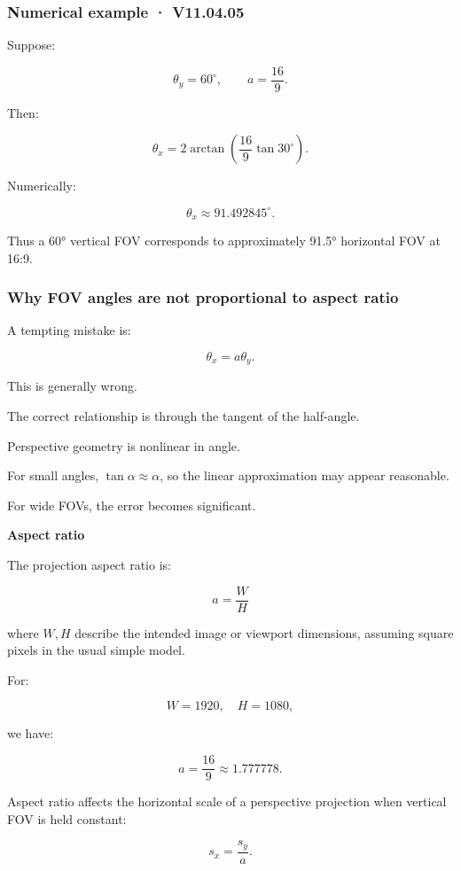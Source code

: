 \subsubsection{Numerical example · V11.04.05}\label{numerical-example-v11.04.05}

Suppose:

\[
 \theta_y=60^\circ, \qquad a=\frac{16}{9}.
\]

Then:

\[
 \theta_x= 2\arctan \left( \frac{16}{9}\tan30^\circ \right).
\]

Numerically:

\[
 \boxed{ \theta_x\approx91.492845^\circ }.
\]

Thus a 60° vertical FOV corresponds to approximately 91.5° horizontal FOV at 16:9.

\subsubsection{Why FOV angles are not proportional to aspect ratio}\label{why-fov-angles-are-not-proportional-to-aspect-ratio}

A tempting mistake is:

\[
 \theta_x=a\theta_y.
\]

This is generally wrong.

The correct relationship is through the tangent of the half-angle.

Perspective geometry is nonlinear in angle.

For small angles, \(\tan\alpha\approx\alpha\), so the linear approximation may appear reasonable.

For wide FOVs, the error becomes significant.

\textbf{Aspect ratio}

The projection aspect ratio is:

\[
 \boxed{ a=\frac WH }
\]

where \(W,H\) describe the intended image or viewport dimensions, assuming square pixels in the usual simple model.

For:

\[
 W=1920,\quad H=1080,
\]

we have:

\[
 \boxed{ a=\frac{16}{9}\approx1.777778 }.
\]

Aspect ratio affects the horizontal scale of a perspective projection when vertical FOV is held constant:

\[
 s_x=\frac{s_y}{a}.
\]


